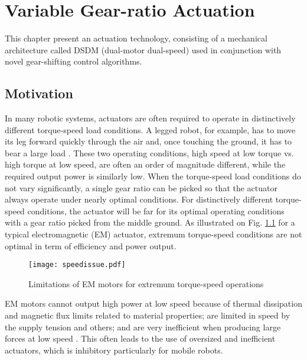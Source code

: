 \chapter{Variable Gear-ratio Actuation }
\label{sec:MultipleSpeedActuationTechnology}

This chapter present an actuation technology, consisting of a mechanical architecture called DSDM (dual-motor dual-speed) used in conjunction with novel gear-shifting control algorithms. 

\section{Motivation}
\label{sec:mot}

In many robotic systems, actuators are often required to operate in distinctively different torque-speed load conditions. A legged robot, for example, has to move its leg forward quickly through the air and, once touching the ground, it has to bear a large load \cite{hirose_study_1984}. These two operating conditions, high speed at low torque vs. high torque at low speed, are often an order of magnitude different, while the required output power is similarly low. When the torque-speed load conditions do not vary significantly, a single gear ratio can be picked so that the actuator always operate under nearly optimal conditions. For distinctively different torque-speed conditions, the actuator will be far for its optimal operating conditions with a gear ratio picked from the middle ground. As illustrated on Fig. \ref{fig:speedissue} for a typical electromagnetic (EM) actuator, extremum torque-speed conditions are not optimal in term of efficiency and power output. 

\begin{figure}[htp]
	\centering
		\texttt{[image: speedissue.pdf]}
	\caption{Limitations of EM motors for extremum torque-speed operations}
	\label{fig:speedissue}
\end{figure}

EM motors cannot output high power at low speed because of thermal dissipation and magnetic flux limits related to material properties; are limited in speed by the supply tension and others; and are very inefficient when producing large forces at low speed \cite{hollerbach_comparative_1992}. This often leads to the use of oversized and inefficient actuators, which is inhibitory particularly for mobile robots.

